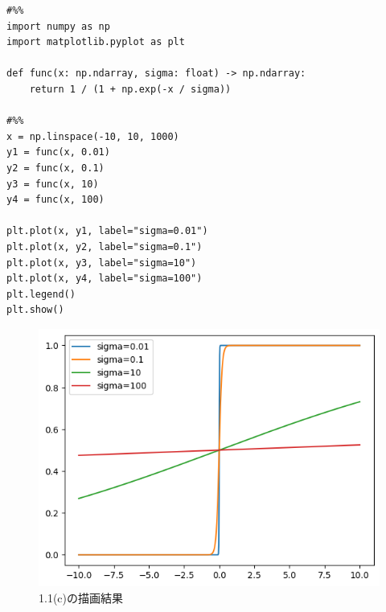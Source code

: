 \documentclass[pdflatex,ja=standard]{bxjsarticle}
\begin{document}
\begin{lstlisting}
#%%
import numpy as np
import matplotlib.pyplot as plt

def func(x: np.ndarray, sigma: float) -> np.ndarray:
    return 1 / (1 + np.exp(-x / sigma))

#%% 
x = np.linspace(-10, 10, 1000)
y1 = func(x, 0.01)
y2 = func(x, 0.1)
y3 = func(x, 10)
y4 = func(x, 100)

plt.plot(x, y1, label="sigma=0.01")
plt.plot(x, y2, label="sigma=0.1")
plt.plot(x, y3, label="sigma=10")
plt.plot(x, y4, label="sigma=100")
plt.legend()
plt.show()
\end{lstlisting}

\begin{figure}
    \centering
    \includegraphics[width=0.5\linewidth]{output_sigmoid_like.png}
    \caption{1.1(c)の描画結果}
    \label{fig:placeholder}
\end{figure}
\end{document}
